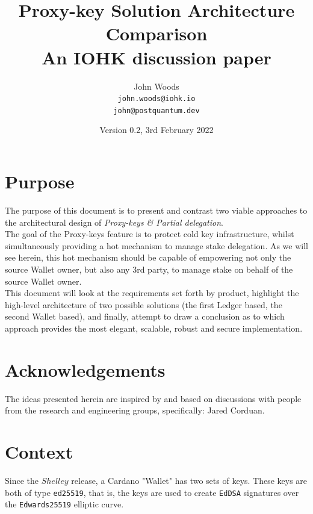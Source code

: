 \documentclass[11pt,a4paper]{article}
\begin{document}
\title {Proxy-key Solution Architecture Comparison \\
       {\large \sc An IOHK discussion paper}}
\date  {Version 0.2, 3rd February 2022}
\author{John Woods         \\ {\small \texttt{john.woods@iohk.io}} \\
                              {\small \texttt{john@postquantum.dev}} \\
}

\maketitle

\section{Purpose}
The purpose of this document is to present and contrast two viable approaches to the 
architectural design of \emph{Proxy-keys \& Partial delegation}. \\

The goal of the Proxy-keys feature is to protect cold key infrastructure, whilst
simultaneously providing a hot mechanism to manage stake delegation. As we will see herein, 
this hot mechanism should be capable of empowering not only the source Wallet owner, but also 
any 3rd party, to manage stake on behalf of the source Wallet owner. \\

This document will look at the requirements set forth by product, highlight the high-level
architecture of two possible solutions (the first Ledger based, the second Wallet based),
and finally, attempt to draw a conclusion as to which approach provides the most elegant,
scalable, robust and secure implementation.

\pagebreak

\tableofcontents

\pagebreak

\section{Acknowledgements}
The ideas presented herein are inspired by and based on discussions with
people from the research and engineering groups, specifically: Jared Corduan.

\section{Context}
Since the $Shelley$ release, a Cardano "Wallet" has two sets of keys. These keys
are both of type \lstinline{ed25519}, that is, the keys are used to create \lstinline{EdDSA}
signatures over the \lstinline{Edwards25519} elliptic curve.
\end{document}
